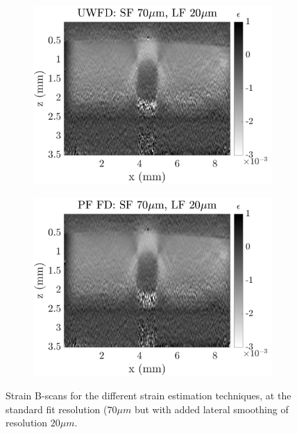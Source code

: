 \begin{figure}[h]
\begin{subfigure}{0.49\textwidth}
        \includegraphics[width=\textwidth]{appendix_figs/uwfd_fr70_lr20.png}
    \end{subfigure}
    \begin{subfigure}{0.49\textwidth}
    	\centering
        \includegraphics[width=\textwidth]{appendix_figs/pffd_fr70_lr20.png}
    \end{subfigure}    
    \caption{Strain B-scans for the different strain estimation techniques, at the standard fit resolution ($70 \mu m$ but with added lateral smoothing of resolution $20 \mu m$.}
    \label{fr70_lr20}
\end{figure}

